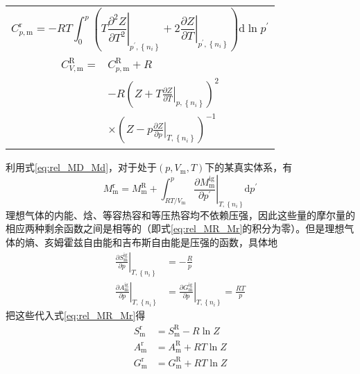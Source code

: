 \documentclass[main.tex]{subfiles}
\begin{document}
\begin{longtable}{m{}}
    \begin{equation}
        C^\text{r}_{p,\text{m}}=-RT\int_0^p\left(T\left.\frac{\partial^2 Z}{\partial T^2}\right|_{p^\prime,\left\{n_i\right\}}+2\left.\frac{\partial Z}{\partial T}\right|_{p^\prime,\left\{n_i\right\}}\right)\mathrm{d}\ln p^\prime
    \end{equation} \\ [-5ex]
    \begin{equation}
        \begin{aligned}
            C^\text{R}_{V,\text{m}}= & C^\text{R}_{p,\text{m}}+R                                                                    \\
                                     & -R\left(Z+T\left.\frac{\partial Z}{\partial T}\right|_{p,\left\{n_i\right\}}\right)^2        \\
                                     & \times\left(Z-p\left.\frac{\partial Z}{\partial p}\right|_{T,\left\{n_i\right\}}\right)^{-1}
        \end{aligned}
    \end{equation}                                                                                                                                                                                                    \\
    \hline
\end{longtable}

利用式\eqref{eq:rel_MD_Md}，对于处于$\left(p,V_\text{m},T\right)$下的某真实体系，有
\begin{equation}
    \label{eq:rel_MR_Mr}    M^\text{r}_\text{m}=M^\text{R}_\text{m}+\int_{RT/V_\text{m}}^p\left.\frac{\partial M^\text{ig}_\text{m}}{\partial p^\prime}\right|_{T,\left\{n_i\right\}}\mathrm{d}p^\prime
\end{equation}
理想气体的内能、焓、等容热容和等压热容均不依赖压强，因此这些量的摩尔量的相应两种剩余函数之间是相等的（即式\eqref{eq:rel_MR_Mr}的积分为零）。但是理想气体的熵、亥姆霍兹自由能和吉布斯自由能是压强的函数，具体地
\begin{align*}
    \left.\frac{\partial S^\text{ig}_\text{m}}{\partial p}\right|_{T,\left\{n_i\right\}} & =-\frac{R}{p}                                                                                      \\
    \left.\frac{\partial A^\text{ig}_\text{m}}{\partial p}\right|_{T,\left\{n_i\right\}} & =\left.\frac{\partial G^\text{ig}_\text{m}}{\partial p}\right|_{T,\left\{n_i\right\}}=\frac{RT}{p}
\end{align*}
把这些代入式\eqref{eq:rel_MR_Mr}得
\begin{align}
    S^\text{r}_\text{m} & =S^\text{R}_\text{m}-R\ln Z  \\
    A^\text{r}_\text{m} & =A^\text{R}_\text{m}+RT\ln Z \\
    G^\text{r}_\text{m} & =G^\text{R}_\text{m}+RT\ln Z
\end{align}
\end{document}
